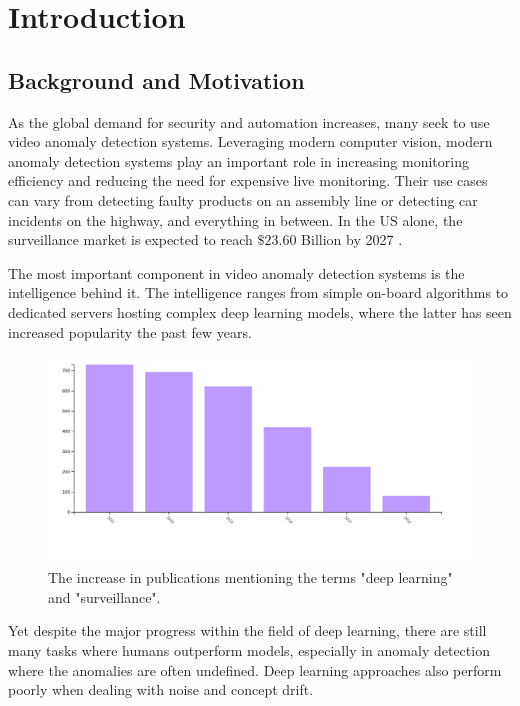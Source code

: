 \chapter{Introduction}
\section{Background and Motivation}
As the global demand for security and automation increases, many seek to use video anomaly detection systems. Leveraging modern computer vision, modern anomaly detection systems play an important role in increasing monitoring efficiency and reducing the need for expensive live monitoring. Their use cases can vary from detecting faulty products on an assembly line or detecting car incidents on the highway, and everything in between. In the US alone, the surveillance market is expected to reach $\$23.60$ Billion by 2027 \cite{us_video_stats}.
\par
The most important component in video anomaly detection systems is the intelligence behind it. The intelligence ranges from simple on-board algorithms to dedicated servers hosting complex deep learning models, where the latter has seen increased popularity the past few years.\par
\begin{figure}[H]
    \centering
    \includegraphics[width=\linewidth]{resources/introduction/deep_learning_surveillance_chart.jpg}
    \caption{The increase in publications mentioning the terms "deep learning" and "surveillance". \cite{deep_learning_surveillance_stats}}
\end{figure}
Yet despite the major progress within the field of deep learning, there are still many tasks where humans outperform models, especially in anomaly detection where the anomalies are often undefined. Deep learning approaches also perform poorly when dealing with noise and concept drift.
\par

